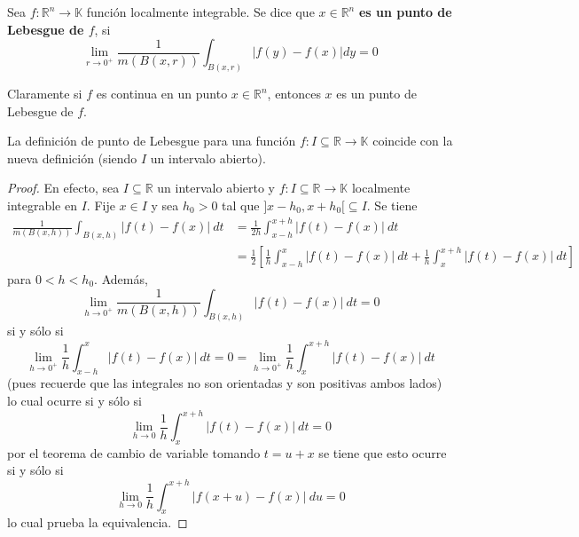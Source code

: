 \documentclass[12pt]{report}
\newcounter{it}
\theoremstyle{largebreak}
\newcommand\abs[1]{\ensuremath{\left|#1\right|}}
\newcommand\cf[3]{\ensuremath{#1:#2\rightarrow#3}}
\begin{document}
    \begin{mydef}
        Sea $\cf{f}{\mathbb{R}^n}{\mathbb{K}}$ función localmente integrable. Se dice que $x\in\mathbb{R}^n$ \textbf{es un punto de Lebesgue de $f$}, si
        \begin{equation*}
            \lim_{r\rightarrow0^+} \frac{1}{m(B(x,r))}\int_{B(x,r)}\abs{f(y)-f(x)}dy=0
        \end{equation*}
    \end{mydef}

    \begin{obs}
        Claramente si $f$ es continua en un punto $x\in\mathbb{R}^n$, entonces $x$ es un punto de Lebesgue de $f$.
    \end{obs}

    \begin{obs}
        La definición de punto de Lebesgue para una función $\cf{f}{I\subseteq\mathbb{R}}{\mathbb{K}}$ coincide con la nueva definición (siendo $I$ un intervalo abierto).
    \end{obs}

    \begin{proof}
        En efecto, sea $I\subseteq\mathbb{R}$ un intervalo abierto y $\cf{f}{I\subseteq\mathbb{R}}{\mathbb{K}}$ localmente integrable en $I$. Fije $x\in I$ y sea $h_0>0$ tal que
        $]x-h_0,x+h_0[\subseteq I$. Se tiene
        \begin{equation*}
            \begin{split}
                \frac{1}{m(B(x,h))}\int_{B(x,h)}\abs{f(t)-f(x)}\:dt&=\frac{1}{2h}\int_{ x-h}^{ x+h}\abs{f(t)-f(x)}\:dt\\
                &=\frac{1}{2}\left[\frac{1}{h}\int_{ x-h}^{x}\abs{f(t)-f(x)}\:dt+\frac{1}{h}\int_{ x}^{ x+h}\abs{f(t)-f(x)}\:dt \right]
            \end{split}
        \end{equation*}
        para $0<h<h_0$. Además,
        \begin{equation*}
            \lim_{h\rightarrow0^+}\frac{1}{m(B(x,h))}\int_{B(x,h)}\abs{f(t)-f(x)}\:dt=0
        \end{equation*}
        si y sólo si
        \begin{equation*}
            \lim_{h\rightarrow0^+}\frac{1}{h}\int_{ x-h}^{x}\abs{f(t)-f(x)}\:dt=0=\lim_{h\rightarrow0^+}\frac{1}{h}\int_{ x}^{ x+h}\abs{f(t)-f(x)}\:dt
        \end{equation*}
        (pues recuerde que las integrales no son orientadas y son positivas ambos lados) lo cual ocurre si y sólo si
        \begin{equation*}
            \lim_{h\rightarrow0}\frac{1}{h}\int_{ x}^{ x+h}\abs{f(t)-f(x)}\:dt=0
        \end{equation*}
        por el teorema de cambio de variable tomando $t=u+x$ se tiene que esto ocurre si y sólo si
        \begin{equation*}
            \lim_{h\rightarrow0}\frac{1}{h}\int_{ x}^{ x+h}\abs{f(x+u)-f(x)}\:du=0
        \end{equation*}
        lo cual prueba la equivalencia.
    \end{proof}
\end{document}
